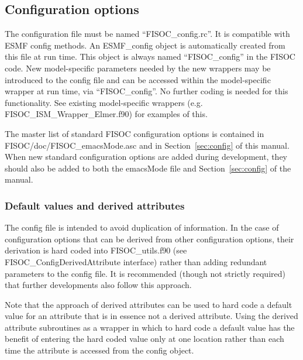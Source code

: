 \documentclass[12pt]{article}
\begin{document}
\subsection{Configuration options}

The configuration file must be named ``FISOC\_config.rc''.  
It is compatible with ESMF config methods.  
An ESMF\_config object is automatically created from this file at run time.
This object is always named ``FISOC\_config'' in the FISOC code.
New model-specific parameters needed by the new wrappers may be 
introduced to the config file and can be accessed 
within the model-specific wrapper at run time, via  ``FISOC\_config''. 
No further coding is needed for this functionality.
See existing model-specific wrappers (e.g. FISOC\_ISM\_Wrapper\_Elmer.f90) 
for examples of this.

The master list of standard FISOC configuration options is contained in 
FISOC/doc/FISOC\_emacsMode.asc and in Section~\ref{sec:config} of this 
manual. 
When new standard configuration options are added during development, they 
should also be added to both the emacsMode file and  
Section~\ref{sec:config} of the manual.


\subsubsection{Default values and derived attributes}

The config file is intended to avoid duplication of information.  
In the case of configuration options that can be derived from other 
configuration options, their derivation is hard coded into 
FISOC\_utils.f90 (see FISOC\_ConfigDerivedAttribute interface) 
rather than adding redundant parameters to the config file.
It is recommended (though not strictly required) that further developments 
also follow this approach. 

Note that the approach of derived attributes can be used to hard code a 
default value for an attribute that is in essence not a derived attribute. 
Using the derived attribute subroutines as a wrapper in which to hard 
code a default value has the benefit of entering the hard coded value 
only at one location rather than each time the attribute is accessed 
from the config object.

\end{document}
